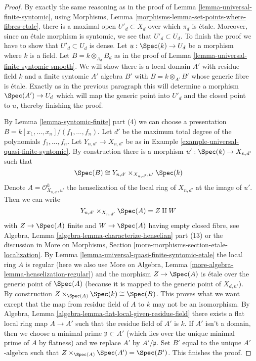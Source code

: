 \begin{proof}
By exactly the same reasoning as in the proof of
Lemma \ref{lemma-universal-finite-syntomic}, using
Morphisms, Lemma \ref{morphisms-lemma-set-points-where-fibres-etale},
there is a maximal open $U'_d \subset X_d$ over which $\pi_d$ is
\'etale. Moreover, since an \'etale morphism is syntomic, we see
that $U'_d \subset U_d$. To finish the proof we have to show
that $U'_d \subset U_d$ is dense. Let $u : \Spec(k) \to U_d$ be a morphism
where $k$ is a field. Let $B = k \otimes_{A_d} B_d$ as in the
proof of Lemma \ref{lemma-universal-finite-syntomic-smooth}.
We will show there is a local domain $A'$ with residue field $k$
and a finite syntomic $A'$ algebra $B'$ with $B = k \otimes_{A'} B'$
whose generic fibre is \'etale. Exactly as in the previous paragraph
this will determine a morphism $\Spec(A') \to U_d$ which will map the
generic point into $U'_d$ and the closed point to $u$, thereby
finishing the proof.

\medskip\noindent
By Lemma \ref{lemma-syntomic-finite} part (4) we can choose a presentation
$B = k[x_1, \ldots, x_n]/(f_1, \ldots, f_n)$.
Let $d'$ be the maximum total degree of the polynomials $f_1, \ldots, f_n$.
Let $Y_{n, d'} \to X_{n, d'}$ be as in
Example \ref{example-universal-quasi-finite-syntomic}.
By construction there is a morphism $u' : \Spec(k) \to X_{n, d'}$
such that
$$
\Spec(B) \cong Y_{n, d'} \times_{X_{n, d'}, u'} \Spec(k)
$$
Denote $A = \mathcal{O}_{X_{n, d'}, u'}^h$ the henselization of the
local ring of $X_{n, d'}$ at the image of $u'$. Then we can write
$$
Y_{n, d'} \times_{X_{n, d'}} \Spec(A) = Z \amalg W
$$
with $Z \to \Spec(A)$ finite and $W \to \Spec(A)$ having empty
closed fibre, see
Algebra, Lemma \ref{algebra-lemma-characterize-henselian} part (13)
or the discussion in More on Morphisms, Section
\ref{more-morphisms-section-etale-localization}.
By Lemma \ref{lemma-universal-quasi-finite-syntomic-etale}
the local ring $A$ is regular (here we also use
More on Algebra, Lemma \ref{more-algebra-lemma-henselization-regular})
and the morphism $Z \to \Spec(A)$ is \'etale over the generic point of
$\Spec(A)$ (because it is mapped to the generic point of $X_{d, n'}$).
By construction $Z \times_{\Spec(A)} \Spec(k) \cong \Spec(B)$.
This proves what we want except that the map from
residue field of $A$ to $k$ may not be an isomorphism.
By Algebra, Lemma \ref{algebra-lemma-flat-local-given-residue-field}
there exists a flat local ring map $A \to A'$ such that the residue
field of $A'$ is $k$. If $A'$ isn't a domain, then we choose a
minimal prime $\mathfrak p \subset A'$ (which lies over the
unique minimal prime of $A$ by flatness) and we replace
$A'$ by $A'/\mathfrak p$. Set $B'$ equal to the unique $A'$-algebra
such that $Z \times_{\Spec(A)} \Spec(A') = \Spec(B')$.
This finishes the proof.
\end{proof}

